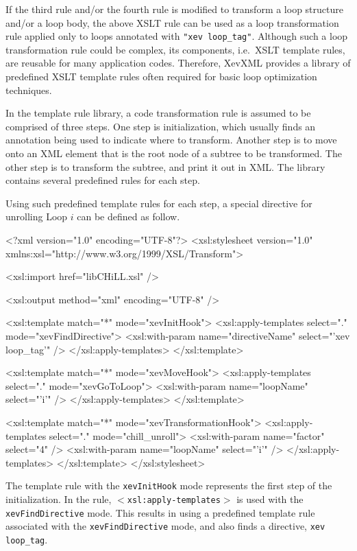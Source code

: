 If the third rule and/or the fourth rule is modified to transform a loop
structure and/or a loop body, the above XSLT rule can be used as a loop
transformation rule applied only to loops annotated with \texttt{"xev
loop\_tag"}. Although such a loop transformation rule could be complex,
its components, i.e.~XSLT template rules, are reusable for many
application codes.  Therefore, XevXML provides a library of predefined
XSLT template rules often required for basic loop optimization techniques.


In the template rule library, a code transformation rule is assumed to
be comprised of three steps. One step is initialization, which usually
finds an annotation being used to indicate where to transform. Another
step is to move onto an XML element that is the root node of a subtree
to be transformed. The other step is to transform the subtree, and print
it out in XML. The library contains several predefined rules for each
step.

Using such predefined template rules for each step, a special directive
for unrolling Loop $i$ can be defined as follow.
\begin{framed}
 \begin{src}
<?xml version="1.0" encoding="UTF-8"?>
  <xsl:stylesheet version="1.0"
  xmlns:xsl="http://www.w3.org/1999/XSL/Transform">

  <xsl:import href="libCHiLL.xsl" />

  <xsl:output method="xml" encoding="UTF-8" />

  <xsl:template match="*" mode="xevInitHook">
   <xsl:apply-templates select="." mode="xevFindDirective">
      <xsl:with-param name="directiveName" select="'xev loop_tag'" />
    </xsl:apply-templates>
  </xsl:template>

  <xsl:template match="*" mode="xevMoveHook">
    <xsl:apply-templates select="." mode="xevGoToLoop">
      <xsl:with-param name="loopName" select="'i'" />
    </xsl:apply-templates>
  </xsl:template>

  <xsl:template match="*" mode="xevTransformationHook">
    <xsl:apply-templates select="." mode="chill_unroll">
      <xsl:with-param name="factor" select="4" />
      <xsl:with-param name="loopName" select="'i'" />
    </xsl:apply-templates>
  </xsl:template>
</xsl:stylesheet>
\end{src}
\end{framed}

The template rule with the \texttt{xevInitHook} mode represents the
first step of the initialization. In the rule,
\texttt{$<$xsl:apply-templates$>$} is used with the
\texttt{xevFindDirective} mode. This results in using a predefined
template rule associated with the \texttt{xevFindDirective} mode, and
also finds a directive, \texttt{xev loop\_tag}.

